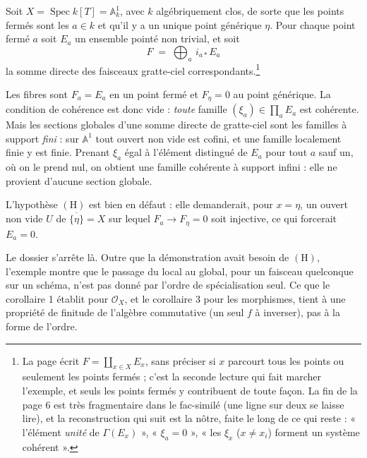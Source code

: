 \documentclass[11pt,a4paper]{article}
\begin{document}
Soit $X = \operatorname{Spec} k[T] = \mathbb{A}^1_k$, avec $k$ algébriquement
clos, de sorte que les points fermés sont les $a \in k$ et qu'il y a un unique
point générique $\eta$. Pour chaque point fermé $a$ soit $E_a$ un ensemble
pointé non trivial, et soit
\[ F \;=\; \bigoplus_{a} \, i_{a *} E_a \]
la somme directe des faisceaux gratte-ciel correspondants.\footnote{La page
écrit $F = \coprod_{x \in X} E_x$, sans préciser si $x$ parcourt tous les
points ou seulement les points fermés ; c'est la seconde lecture qui fait
marcher l'exemple, et seuls les points fermés y contribuent de toute façon.
La fin de la page 6 est très fragmentaire dans le fac-similé (une ligne sur
deux se laisse lire), et la reconstruction qui suit est la nôtre, faite le
long de ce qui reste : « l'élément \emph{unité} de $\Gamma(E_x)$ », «
$\xi_a = 0$ », « les $\xi_x$ ($x \neq x_i$) forment un système cohérent ».}

Les fibres sont $F_a = E_a$ en un point fermé et $F_\eta = 0$ au point
générique. La condition de cohérence est donc vide : \emph{toute} famille
$(\xi_a) \in \prod_a E_a$ est cohérente. Mais les sections globales d'une
somme directe de gratte-ciel sont les familles à support \emph{fini} : sur
$\mathbb{A}^1$ tout ouvert non vide est cofini, et une famille localement
finie y est finie. Prenant $\xi_a$ égal à l'élément distingué de $E_a$ pour
tout $a$ sauf un, où on le prend nul, on obtient une famille cohérente à
support infini : elle ne provient d'aucune section globale.

L'hypothèse $(\mathrm{H})$ est bien en défaut : elle demanderait, pour
$x = \eta$, un ouvert non vide $U$ de $\overline{\{\eta\}} = X$ sur lequel
$F_a \to F_\eta = 0$ soit injective, ce qui forcerait $E_a = 0$.

Le dossier s'arrête là. Outre que la démonstration avait besoin de
$(\mathrm{H})$, l'exemple montre que le passage du local
au global, pour un faisceau quelconque sur un schéma, n'est pas donné par
l'ordre de spécialisation seul. Ce que le corollaire 1 établit pour
$\mathcal{O}_X$, et le corollaire 3 pour les morphismes, tient à une propriété
de finitude de l'algèbre commutative (un seul $f$ à inverser), pas à
la forme de l'ordre.
\end{document}
